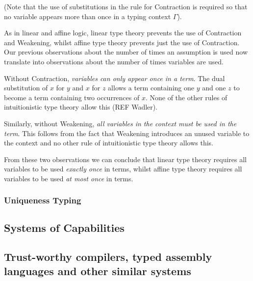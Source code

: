 \documentclass[]{unswthesis}
\begin{document}
(Note that the use of substitutions in the rule for Contraction is required so that no variable appears more than once in a typing context $\Gamma$).

As in linear and affine logic, linear type theory prevents the use of Contraction and Weakening, whilst affine type theory prevents just the use of Contraction. Our previous observations about the number of times an assumption is used now translate into observations about the number of times variables are used.

Without Contraction, \textit{variables can only appear once in a term}. The dual substitution of $x$ for $y$ and $x$ for $z$ allows a term containing one $y$ and one $z$ to become a term containing two occurrences of $x$. None of the other rules of intuitionistic type theory allow this (REF Wadler).

Similarly, without Weakening, \textit{all variables in the context must be used in the term}. This follows from the fact that Weakening introduces an unused variable to the context and no other rule of intuitionistic type theory allows this.

From these two observations we can conclude that linear type theory requires all variables to be used \textit{exactly once} in terms, whilst affine type theory requires all variables to be used \textit{at most once} in terms.

\subsubsection{Uniqueness Typing}




\subsection{Systems of Capabilities}




\subsection{Trust-worthy compilers, typed assembly languages and other similar systems}
\end{document}

